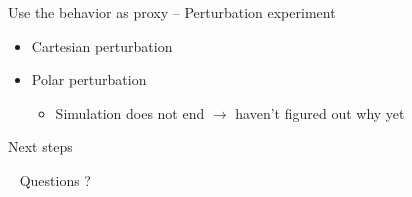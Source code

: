 \documentclass[bigger]{beamer}
\begin{document}
\begin{frame}[<+->][label={sec:org2ad9d53}]{Use the behavior as proxy -- Perturbation experiment}
\begin{itemize}
\item Cartesian perturbation
\item Polar perturbation
\begin{itemize}
\item Simulation does not end \(\to\) haven't figured out why yet
\end{itemize}
\end{itemize}
\end{frame}
\begin{frame}[label={sec:org993e633}]{Next steps}
\end{frame}
\begin{frame}[label={sec:org0f1a1d7},standout]{~}
Questions ?
\end{frame}
\end{document}
